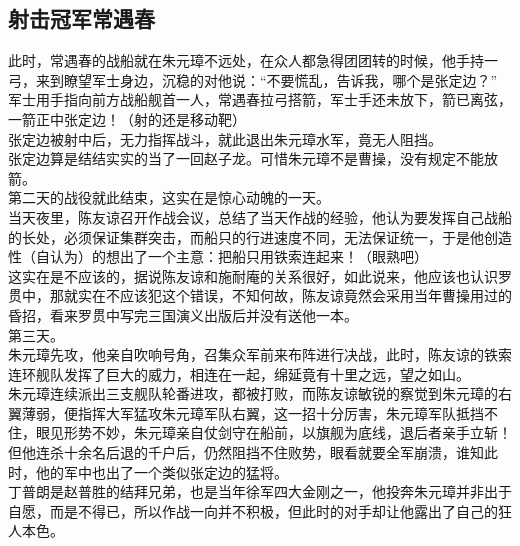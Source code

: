 \begin{multicols}{\theparacolNo}
\subsection{射击冠军常遇春}
此时，常遇春的战船就在朱元璋不远处，在众人都急得团团转的时候，他手持一弓，来到瞭望军士身边，沉稳的对他说：“不要慌乱，告诉我，哪个是张定边？”\\

军士用手指向前方战船舰首一人，常遇春拉弓搭箭，军士手还未放下，箭已离弦，一箭正中张定边！（射的还是移动靶）\\

张定边被射中后，无力指挥战斗，就此退出朱元璋水军，竟无人阻挡。\\

张定边算是结结实实的当了一回赵子龙。可惜朱元璋不是曹操，没有规定不能放箭。\\

第二天的战役就此结束，这实在是惊心动魄的一天。\\

当天夜里，陈友谅召开作战会议，总结了当天作战的经验，他认为要发挥自己战船的长处，必须保证集群突击，而船只的行进速度不同，无法保证统一，于是他创造性（自认为）的想出了一个主意：把船只用铁索连起来！（眼熟吧）\\

这实在是不应该的，据说陈友谅和施耐庵的关系很好，如此说来，他应该也认识罗贯中，那就实在不应该犯这个错误，不知何故，陈友谅竟然会采用当年曹操用过的昏招，看来罗贯中写完三国演义出版后并没有送他一本。\\

第三天。\\

朱元璋先攻，他亲自吹响号角，召集众军前来布阵进行决战，此时，陈友谅的铁索连环舰队发挥了巨大的威力，相连在一起，绵延竟有十里之远，望之如山。\\

朱元璋连续派出三支舰队轮番进攻，都被打败，而陈友谅敏锐的察觉到朱元璋的右翼薄弱，便指挥大军猛攻朱元璋军队右翼，这一招十分厉害，朱元璋军队抵挡不住，眼见形势不妙，朱元璋亲自仗剑守在船前，以旗舰为底线，退后者亲手立斩！\\

但他连杀十余名后退的千户后，仍然阻挡不住败势，眼看就要全军崩溃，谁知此时，他的军中也出了一个类似张定边的猛将。\\

丁普朗是赵普胜的结拜兄弟，也是当年徐军四大金刚之一，他投奔朱元璋并非出于自愿，而是不得已，所以作战一向并不积极，但此时的对手却让他露出了自己的狂人本色。\\


\end{multicols}
